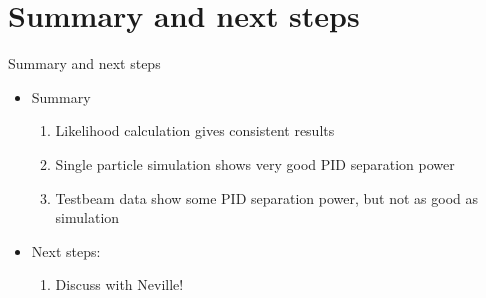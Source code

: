 \documentclass{beamer}
\begin{document}
\section{Summary and next steps}
\begin{frame}{Summary and next steps}
  \begin{itemize}
    \setlength\itemsep{2.0em}
    \item{Summary}
    \begin{enumerate}
      \setlength\itemsep{1.0em}
      \item{Likelihood calculation gives consistent results}
      \item{Single particle simulation shows very good PID separation power}
      \item{Testbeam data show some PID separation power, but not as good as simulation}
    \end{enumerate}
    \item{Next steps:}
    \begin{enumerate}
      \setlength\itemsep{1.0em}
      \item{\color{red}Discuss with Neville!}
    \end{enumerate}
  \end{itemize}
\end{frame}
\end{document}
